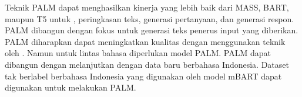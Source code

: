 Teknik   \gls{PALM}  dapat menghasilkan kinerja yang lebih baik dari \gls{MASS}, \gls{BART}, maupun T5 untuk  , peringkasan teks, generasi pertanyaan, dan generasi respon.
\gls{PALM} dibangun dengan fokus untuk generasi teks penerus input yang diberikan.
\gls{PALM} diharapkan dapat meningkatkan kualitas \amrparsing{} dengan menggunakan teknik  oleh \textcite{bai2022}.
Namun untuk \amrparsing{} lintas bahasa diperlukan model \multil{} \gls{PALM}.
\Multil{} \gls{PALM} dapat dibangun dengan melanjutkan \pretraining{} dengan data baru berbahasa Indonesia.
Dataset tak berlabel berbahasa Indonesia yang digunakan oleh model mBART  dapat digunakan untuk melakukan \pretraining{} \multil{} \gls{PALM}.
